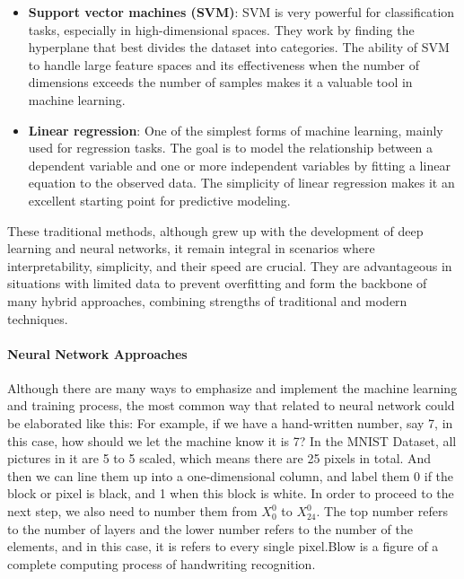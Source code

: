\documentclass[12pt]{article}
\begin{document}
\begin{itemize}
    \item \textbf{Support vector machines (SVM)}: SVM is very powerful for classification tasks, especially in high-dimensional spaces. They work by finding the hyperplane that best divides the dataset into categories. The ability of SVM to handle large feature spaces and its effectiveness when the number of dimensions exceeds the number of samples makes it a valuable tool in machine learning.

    \item \textbf{Linear regression}: One of the simplest forms of machine learning, mainly used for regression tasks. The goal is to model the relationship between a dependent variable and one or more independent variables by fitting a linear equation to the observed data. The simplicity of linear regression makes it an excellent starting point for predictive modeling.
\end{itemize}
These traditional methods, although grew up with the development of deep learning and neural networks, it remain integral in scenarios where interpretability, simplicity, and their speed are crucial. They are advantageous in situations with limited data to prevent overfitting and form the backbone of many hybrid approaches, combining strengths of traditional and modern techniques.

\paragraph{Neural Network Approaches}
Although there are many ways to emphasize and implement the machine learning and training process, the most common way that related to neural network could be elaborated like this: For example, if we have a hand-written number, say 7, in this case, how should we let the machine know it is 7? In the MNIST Dataset, all pictures in it are 5 to 5 scaled, which means there are 25 pixels in total. And then we can line them up into a one-dimensional column, and label them 0 if the block or pixel is black, and 1 when this block is white. In order to proceed to the next step, we also need to number them from $X^{0}_{0}$ to $X^{0}_{24}$. The top number refers to the number of layers and the lower number refers to the number of the elements, and in this case, it is refers to every single pixel.Blow is a figure of a complete computing process of handwriting recognition.
\end{document}
